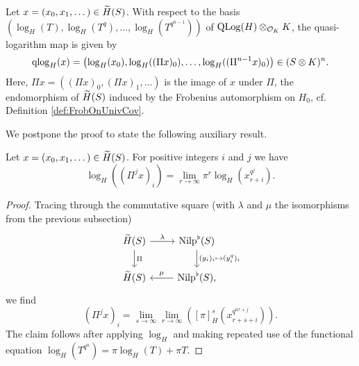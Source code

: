 \documentclass[../main.tex]{subfiles}
\begin{document}
\begin{prop}\label{prop:qlogmapExplicit}
  Let $x = (x_0, x_1, \dots) \in \Tilde H(S)$. With respect to the basis
  $(\log_H(T),\allowbreak \log_H(T^q), \allowbreak \dots, \allowbreak \log_H(T^{q^{n-1}}))$ of 
  $\QLog(H) \otimes_{\cO_K} K$, the quasi-logarithm map is given by
  \begin{equation*}
    \qlog_H(x) = \left(\log_H(x_0), \log_H((\Pi x)_0), \dots, \log_H((\Pi^{n-1}
    x)_0)\right) \in (S\otimes K)^n.
  \end{equation*}
  Here, $\Pi x = ((\Pi x)_0, (\Pi x)_1, \dots)$ is the image of $x$ under
  $\Pi$, the endomorphism of $\Tilde
  H(S)$ induced by the Frobenius automorphism on $H_0$, cf. Definition
  \ref{def:FrobOnUnivCov}.
\end{prop}
We postpone the proof to state the following auxiliary result.
\begin{lem}\label{lem:FrobOnTildeHExpl}
  Let $x = (x_0 ,x_1, \dots) \in \Tilde H(S)$. For positive integers $i$ and
  $j$ we have
  \begin{equation*}
    \log_H((\Pi^j x)_i) = \lim_{r \to \infty} \pi^r \log_H(x_{r+i}^{q^j}).
  \end{equation*}
\begin{proof}
  Tracing through the commutative square (with $\lambda$ and $\mu$ the
  isomorphisms from the previous subsection)
    \begin{equation*}
    \begin{tikzcd}[ampersand replacement=\&]
    	{\Tilde H(S)} \& {\Nilp^\flat(S)} \\
    	{\Tilde H(S)} \& {\Nilp^\flat(S),}
    	\arrow["\lambda", from=1-1, to=1-2]
    	\arrow["\Pi", from=1-1, to=2-1]
    	\arrow["{(y_i)_i \mapsto (y_i^{q})_i}", from=1-2, to=2-2]
    	\arrow["\mu"', from=2-2, to=2-1]
    \end{tikzcd}
    \end{equation*}
    we find 
    \begin{equation} \label{eq:CompsOfPiExplicit}
      (\Pi^j x)_i = \lim_{s \to \infty} \lim_{r\to\infty} \left([\pi]_H^s
      (x_{r+s+i}^{q^{nr + j}})\right).
    \end{equation}
    The claim follows after applying $\log_H$ and making repeated use of the
    functional equation $\log_H(T^{q^n}) = \pi \log_H(T) + \pi T$.
\end{proof}
\end{lem}
\end{document}
